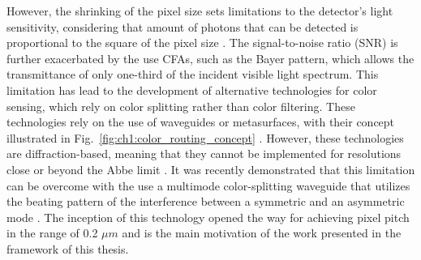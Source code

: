 However, the shrinking of the pixel size sets limitations to the detector's light sensitivity, considering that amount of photons that can be detected is proportional to the square of the pixel size \cite{Kim2024FreeformSensors}. The signal-to-noise ratio (SNR) is further exacerbated by the use CFAs, such as the Bayer pattern, which allows the transmittance of only one-third of the incident visible light spectrum. This limitation has lead to the development of alternative technologies for color sensing, which rely on color splitting rather than color filtering. These technologies rely on the use of waveguides or metasurfaces, with their concept illustrated in Fig.~\ref{fig:ch1:color_routing_concept}   \cite{Nishiwaki2013EfficientSensors, Miyata2019High-SensitivityMetasurfaces, Kim2024FreeformSensors, Zou2022Pixel-levelMetasurfaces, Catrysse2022SubwavelengthEfficiency}. However, these technologies are diffraction-based, meaning that they cannot be implemented for resolutions close or beyond the Abbe limit \cite{Shramkova2024HighSeparation}. It was recently demonstrated that this limitation can be overcome with the use a multimode color-splitting waveguide that utilizes the beating pattern of the interference between a symmetric and an asymmetric mode \cite{Kang2023Wafer-level-integratedSplitters}. The inception of this technology opened the way for achieving pixel pitch in the range of 0.2 $\mu m$ and is the main motivation of the work presented in the framework of this thesis. 


